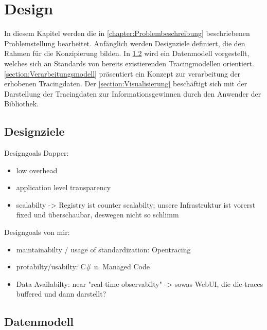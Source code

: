 %

\chapter{Design}
In diesem Kapitel werden die in \cref{chapter:Problembeschreibung} beschriebenen Problemstellung bearbeitet. Anfänglich werden Designziele definiert, die den Rahmen für die Konzipierung bilden. In \cref{section:Datenmodell} wird ein Datenmodell vorgestellt, welches sich an Standards von bereits existierenden Tracingmodellen orientiert. \cref{section:Verarbeitungsmodell} präsentiert ein Konzept zur verarbeitung der erhobenen Tracingdaten. Der \cref{section:Visualisierung} beschäftigt sich mit der Darstellung der Tracingdaten zur Informationsgewinnen durch den Anwender der Bibliothek.

\section{Designziele}
\label{section:Designziele}

Designgoals Dapper:
\begin{itemize}
	\item low overhead
	\item application level transparency
	\item scalabilty -> Registry ist counter scalabilty; unsere Infrastruktur ist vorerst fixed und überschaubar, deswegen nicht so schlimm
\end{itemize}
Designgoals von mir:
\begin{itemize}
	\item maintainabilty / usage of standardization: Opentracing
	\item protabilty/usabilty: C\# u. Managed Code
	\item Data Availabilty: near "real-time observabilty" -> sowas WebUI, die die traces buffered und dann darstellt?
\end{itemize}
\label{chapter:Design}
\section{Datenmodell}
\label{section:Datenmodell}
